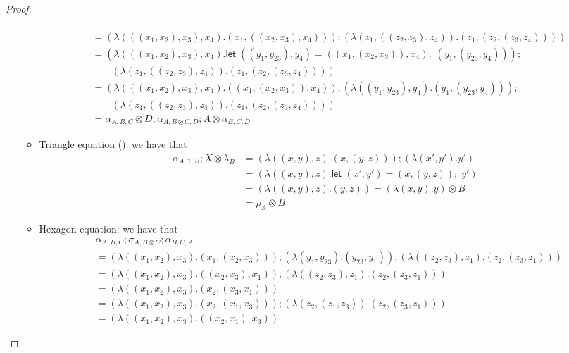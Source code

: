 \documentclass[acmsmall,screen,review]{acmart}
\newcommand{\mb}[1]{\ensuremath{\mathbf{#1}}}
\newcommand{\ms}[1]{\ensuremath{\mathsf{#1}}}
\newcommand{\letexpr}[3]{\ensuremath{\ms{let}\;#1 = #2;\;#3}}
\newcommand{\cmark}{\ding{51}}%
\begin{document}
\begin{proof}
\begin{itemize}
\begin{itemize}
\begin{align*}
      \\
      &= (\lambda (((x_1, x_2), x_3), x_4) . (x_1, ((x_2, x_3), x_4))) ;
      (\lambda (z_1, ((z_2, z_3), z_4)) . (z_1, (z_2, (z_3, z_4))))
      \\
      &= (\lambda (((x_1, x_2), x_3), x_4) . 
        \letexpr{((y_1, y_{23}), y_4)}{((x_1, (x_2, x_3)), x_4)}{(y_1, (y_{23}, y_4))}) ; 
        \\ & \qquad 
      (\lambda (z_1, ((z_2, z_3), z_4)) . (z_1, (z_2, (z_3, z_4))))
      \\
      &= (\lambda (((x_1, x_2), x_3), x_4) . ((x_1, (x_2, x_3)), x_4)) ; 
      (\lambda ((y_1, y_{23}), y_4) . (y_1, (y_{23}, y_4))) ; \\ & \qquad 
      (\lambda (z_1, ((z_2, z_3), z_4)) . (z_1, (z_2, (z_3, z_4))))
      \\
      &= \alpha_{A, B, C} \otimes D ; \alpha_{A, B \otimes C, D} ; A \otimes \alpha_{B, C, D}
    \end{align*}
    \item Triangle equation (\cmark): we have that
    \begin{align*}
      \alpha_{A, \mb{1}, B} ; X \otimes \lambda_B
      &= (\lambda ((x, y), z) . (x, (y, z))) ; (\lambda (x', y') . y') \\
      &= (\lambda ((x, y), z) . \letexpr{(x', y')}{(x, (y, z))}{y'}) \\
      &= (\lambda ((x, y), z) . (y, z)) 
        = (\lambda (x, y) . y) \otimes B
        \\
      &= \rho_A \otimes B
    \end{align*}
    \item Hexagon equation: we have that
    \begin{align*}
      &\alpha_{A, B, C} ; \sigma_{A, B \otimes C} ; \alpha_{B, C, A} \\
      &= (\lambda ((x_1, x_2), x_3) . (x_1, (x_2, x_3))) 
        ; (\lambda (y_1, y_{23}) . (y_{23}, y_1))
        ; (\lambda ((z_2, z_3), z_1) . (z_2, (z_3, z_1)))
      \\
      &= (\lambda ((x_1, x_2), x_3) . ((x_2, x_3), x_1)) 
        ;  (\lambda ((z_2, z_3), z_1) . (z_2, (z_3, z_1))) 
      \\
      &= (\lambda ((x_1, x_2), x_3) . (x_2, (x_3, x_1))) \\
      &= (\lambda ((x_1, x_2), x_3) . (x_2, (x_1, x_3)))
        ; (\lambda (z_2, (z_1, z_3)) . (z_2, (z_3, z_1)))
      \\
      &= (\lambda ((x_1, x_2), x_3) . ((x_2, x_1), x_3)) 

\end{align*}
\end{itemize}
\end{itemize}
\end{proof}
\end{document}
